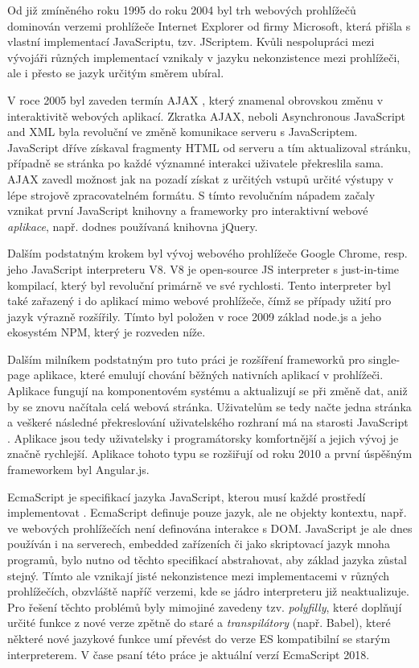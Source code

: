 Od již zmíněného roku 1995 do roku 2004 byl trh webových prohlížečů dominován verzemi prohlížeče Internet Explorer od firmy Microsoft, která přišla s vlastní implementací JavaScriptu, tzv. JScriptem. Kvůli nespolupráci mezi vývojáři různých implementací vznikaly v jazyku nekonzistence mezi prohlížeči, ale i přesto se jazyk určitým směrem ubíral.

V roce 2005 byl zaveden termín AJAX \cite{Garrett2005}, který znamenal obrovskou změnu v interaktivitě webových aplikací. Zkratka AJAX, neboli Asynchronous JavaScript and XML byla revoluční ve změně komunikace serveru s JavaScriptem. JavaScript dříve získaval fragmenty HTML od serveru a tím aktualizoval stránku, případně se stránka po každé významné interakci uživatele překreslila sama. AJAX zavedl možnost jak na pozadí získat z určitých vstupů určité výstupy v lépe strojově zpracovatelném formátu. S tímto revolučním nápadem začaly vznikat první JavaScript knihovny a frameworky pro interaktivní webové \emph{aplikace}, např. dodnes používaná knihovna jQuery.

Dalším podstatným krokem byl vývoj webového prohlížeče Google Chrome, resp. jeho JavaScript interpreteru V8. V8 je open-source JS interpreter s just-in-time kompilací, který byl revoluční primárně ve své rychlosti. Tento interpreter byl také zařazený i do aplikací mimo webové prohlížeče, čímž se případy užití pro jazyk výrazně rozšířily. Tímto byl položen v roce 2009 základ node.js \cite{satheesh2015web} a jeho ekosystém NPM, který je rozveden níže.

Dalším milníkem podstatným pro tuto práci je rozšíření frameworků pro single-page aplikace, které emulují chování běžných nativních aplikací v prohlížeči. Aplikace fungují na komponentovém systému a aktualizují se při změně dat, aniž by se znovu načítala celá webová stránka. Uživatelům se tedy načte jedna stránka a veškeré následné překreslování uživatelského rozhraní má na starosti JavaScript \cite{fink2014pro}. Aplikace jsou tedy uživatelsky i programátorsky komfortnější a jejich vývoj je značně rychlejší. Aplikace tohoto typu se rozšiřují od roku 2010 a první úspěšným frameworkem byl Angular.js.


EcmaScript je specifikací jazyka JavaScript, kterou musí každé prostředí implementovat \cite{ecmascript}. EcmaScript definuje pouze jazyk, ale ne objekty kontextu, např. ve webových prohlížečích není definována interakce s DOM. JavaScript je ale dnes používán i na serverech, embedded zařízeních či jako skriptovací jazyk mnoha programů, bylo nutno od těchto specifikací abstrahovat, aby základ jazyka zůstal stejný. Tímto ale vznikají jisté nekonzistence mezi implementacemi v různých prohlížečích, obzvláště napříč verzemi, kde se jádro interpreteru již neaktualizuje. Pro řešení těchto problémů byly mimojiné zavedeny tzv. \emph{polyfilly}, které doplňují určité funkce z nové verze zpětně do staré a \emph{transpilátory} (např. Babel), které některé nové jazykové funkce umí převést do verze ES kompatibilní se starým interpreterem. V čase psaní této práce je aktuální verzí EcmaScript 2018.

